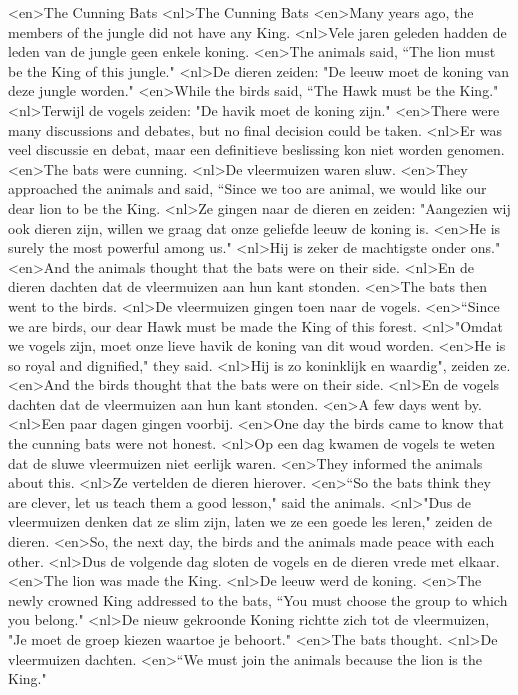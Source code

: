 <en>The Cunning Bats
<nl>The Cunning Bats
<en>Many years ago, the members of the jungle did not have any King.
<nl>Vele jaren geleden hadden de leden van de jungle geen enkele koning.
<en>The animals said, “The lion must be the King of this jungle."
<nl>De dieren zeiden: "De leeuw moet de koning van deze jungle worden."
<en>While the birds said, “The Hawk must be the King."
<nl>Terwijl de vogels zeiden: "De havik moet de koning zijn."
<en>There were many discussions and debates, but no final decision could be taken.
<nl>Er was veel discussie en debat, maar een definitieve beslissing kon niet worden genomen.
<en>The bats were cunning.
<nl>De vleermuizen waren sluw.
<en>They approached the animals and said, “Since we too are animal, we would like our dear lion to be the King.
<nl>Ze gingen naar de dieren en zeiden: "Aangezien wij ook dieren zijn, willen we graag dat onze geliefde leeuw de koning is.
<en>He is surely the most powerful among us."
<nl>Hij is zeker de machtigste onder ons."
<en>And the animals thought that the bats were on their side.
<nl>En de dieren dachten dat de vleermuizen aan hun kant stonden.
<en>The bats then went to the birds.
<nl>De vleermuizen gingen toen naar de vogels.
<en>“Since we are birds, our dear Hawk must be made the King of this forest.
<nl>"Omdat we vogels zijn, moet onze lieve havik de koning van dit woud worden.
<en>He is so royal and dignified," they said.
<nl>Hij is zo koninklijk en waardig", zeiden ze.
<en>And the birds thought that the bats were on their side.
<nl>En de vogels dachten dat de vleermuizen aan hun kant stonden.
<en>A few days went by.
<nl>Een paar dagen gingen voorbij.
<en>One day the birds came to know that the cunning bats were not honest.
<nl>Op een dag kwamen de vogels te weten dat de sluwe vleermuizen niet eerlijk waren.
<en>They informed the animals about this.
<nl>Ze vertelden de dieren hierover.
<en>“So the bats think they are clever, let us teach them a good lesson," said the animals.
<nl>"Dus de vleermuizen denken dat ze slim zijn, laten we ze een goede les leren," zeiden de dieren.
<en>So, the next day, the birds and the animals made peace with each other.
<nl>Dus de volgende dag sloten de vogels en de dieren vrede met elkaar.
<en>The lion was made the King.
<nl>De leeuw werd de koning.
<en>The newly crowned King addressed to the bats, “You must choose the group to which you belong."
<nl>De nieuw gekroonde Koning richtte zich tot de vleermuizen, "Je moet de groep kiezen waartoe je behoort."
<en>The bats thought.
<nl>De vleermuizen dachten.
<en>“We must join the animals because the lion is the King."
